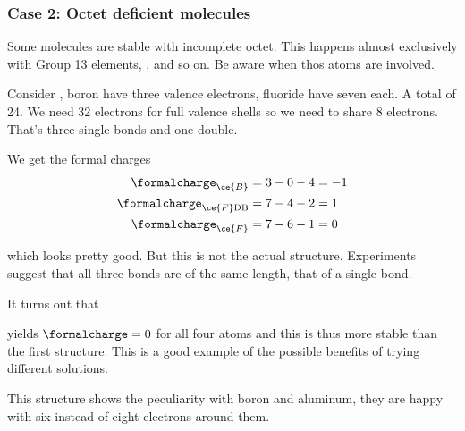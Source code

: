 \documentclass[../mit-general-chemistry.tex]{subfiles}
\begin{document}
\subsubsection{Case 2: Octet deficient molecules}

Some molecules are stable with incomplete octet. This happens almost
exclusively with Group 13 elements, ,  and so on. Be
aware when thos atoms are involved.

Consider , boron have three valence electrons, fluoride have
seven each. A total of 24. We need 32 electrons for full valence
shells so we need to share 8 electrons. That's three single bonds and
one double.

\begin{center}
\end{center}

We get the formal charges
\begin{align*}
  \formalcharge_{\ce{B}} &= 3 - 0 - 4 = -1 \\
  \formalcharge_{\ce{F}\text{DB}} &= 7 - 4 - 2 = 1 \\
  \formalcharge_{\ce{F}} &= 7 - 6 - 1 = 0 \\
\end{align*}

which looks pretty good. But this is not the actual
structure. Experiments suggest that all three  bonds are
of the same length, that of a single bond.

It turns out that

\begin{center}
\end{center}

yields $\formalcharge = 0$ for all four atoms and this is thus more
stable than the first structure. This is a good example of the
possible benefits of trying different solutions.

This structure shows the peculiarity with boron and aluminum, they are
happy with six instead of eight electrons around them.
\end{document}
